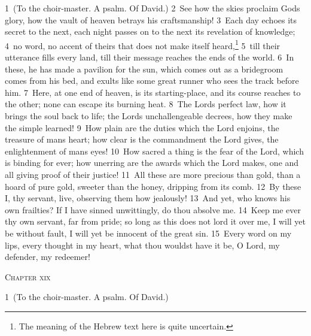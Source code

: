 \documentclass[10pt]{book} %
\begin{document}
\textcolor{benred8}{1}~(To the choir-master. A psalm. Of David.)
\textcolor{benred8}{2}~See how the skies proclaim God\textquotesingle s glory, how the vault of heaven betrays his craftsmanship! \textcolor{benred8}{3}~Each day echoes its secret to the next, each night passes on to the next its revelation of knowledge; \textcolor{benred8}{4}~no word, no accent of theirs that does not make itself heard,\footnote[1]{The meaning of the Hebrew text here is quite uncertain.} \textcolor{benred8}{5}~till their utterance fills every land, till their message reaches the ends of the world. \textcolor{benred8}{6}~In these, he has made a pavilion for the sun, which comes out as a bridegroom comes from his bed, and exults like some great runner who sees the track before him. \textcolor{benred8}{7}~Here, at one end of heaven, is its starting-place, and its course reaches to the other; none can escape its burning heat.
\textcolor{benred8}{8}~The Lord\textquotesingle s perfect law, how it brings the soul back to life; the Lord\textquotesingle s unchallengeable decrees, how they make the simple learned! \textcolor{benred8}{9}~How plain are the duties which the Lord enjoins, the treasure of man\textquotesingle s heart; how clear is the commandment the Lord gives, the enlightenment of man\textquotesingle s eyes! \textcolor{benred8}{10}~How sacred a thing is the fear of the Lord, which is binding for ever; how unerring are the awards which the Lord makes, one and all giving proof of their justice! \textcolor{benred8}{11}~All these are more precious than gold, than a hoard of pure gold, sweeter than the honey, dripping from its comb. \textcolor{benred8}{12}~By these I, thy servant, live, observing them how jealously! \textcolor{benred8}{13}~And yet, who knows his own frailties? If I have sinned unwittingly, do thou absolve me. \textcolor{benred8}{14}~Keep me ever thy own servant, far from pride; so long as this does not lord it over me, I will yet be without fault, I will yet be innocent of the great sin. \textcolor{benred8}{15}~Every word on my lips, every thought in my heart, what thou wouldst have it be, O Lord, my defender, my redeemer!
\begin{large}\begin{center}\textsc{Chapter xix}\end{center}\end{large}
\textcolor{benred8}{1}~(To the choir-master. A psalm. Of David.)
\end{document}
